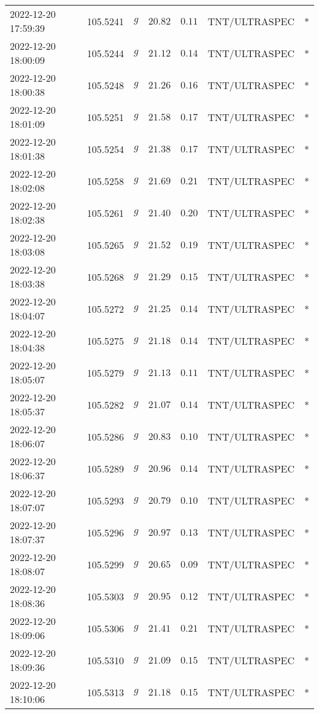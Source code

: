 \documentclass{nature_plusfigure}
\begin{document}
\begin{supplement}
\begin{center}
\begin{longtable}{lllllll}
2022-12-20 17:59:39 & 105.5241 & $g$ & $20.82$ & $0.11$ & TNT/ULTRASPEC & * \\ 
2022-12-20 18:00:09 & 105.5244 & $g$ & $21.12$ & $0.14$ & TNT/ULTRASPEC & * \\ 
2022-12-20 18:00:38 & 105.5248 & $g$ & $21.26$ & $0.16$ & TNT/ULTRASPEC & * \\ 
2022-12-20 18:01:09 & 105.5251 & $g$ & $21.58$ & $0.17$ & TNT/ULTRASPEC & * \\ 
2022-12-20 18:01:38 & 105.5254 & $g$ & $21.38$ & $0.17$ & TNT/ULTRASPEC & * \\ 
2022-12-20 18:02:08 & 105.5258 & $g$ & $21.69$ & $0.21$ & TNT/ULTRASPEC & * \\ 
2022-12-20 18:02:38 & 105.5261 & $g$ & $21.40$ & $0.20$ & TNT/ULTRASPEC & * \\ 
2022-12-20 18:03:08 & 105.5265 & $g$ & $21.52$ & $0.19$ & TNT/ULTRASPEC & * \\ 
2022-12-20 18:03:38 & 105.5268 & $g$ & $21.29$ & $0.15$ & TNT/ULTRASPEC & * \\ 
2022-12-20 18:04:07 & 105.5272 & $g$ & $21.25$ & $0.14$ & TNT/ULTRASPEC & * \\ 
2022-12-20 18:04:38 & 105.5275 & $g$ & $21.18$ & $0.14$ & TNT/ULTRASPEC & * \\ 
2022-12-20 18:05:07 & 105.5279 & $g$ & $21.13$ & $0.11$ & TNT/ULTRASPEC & * \\ 
2022-12-20 18:05:37 & 105.5282 & $g$ & $21.07$ & $0.14$ & TNT/ULTRASPEC & * \\ 
2022-12-20 18:06:07 & 105.5286 & $g$ & $20.83$ & $0.10$ & TNT/ULTRASPEC & * \\ 
2022-12-20 18:06:37 & 105.5289 & $g$ & $20.96$ & $0.14$ & TNT/ULTRASPEC & * \\ 
2022-12-20 18:07:07 & 105.5293 & $g$ & $20.79$ & $0.10$ & TNT/ULTRASPEC & * \\ 
2022-12-20 18:07:37 & 105.5296 & $g$ & $20.97$ & $0.13$ & TNT/ULTRASPEC & * \\ 
2022-12-20 18:08:07 & 105.5299 & $g$ & $20.65$ & $0.09$ & TNT/ULTRASPEC & * \\ 
2022-12-20 18:08:36 & 105.5303 & $g$ & $20.95$ & $0.12$ & TNT/ULTRASPEC & * \\ 
2022-12-20 18:09:06 & 105.5306 & $g$ & $21.41$ & $0.21$ & TNT/ULTRASPEC & * \\ 
2022-12-20 18:09:36 & 105.5310 & $g$ & $21.09$ & $0.15$ & TNT/ULTRASPEC & * \\ 
2022-12-20 18:10:06 & 105.5313 & $g$ & $21.18$ & $0.15$ & TNT/ULTRASPEC & * \\ 

\end{longtable}
\end{center}
\end{supplement}
\end{document}
